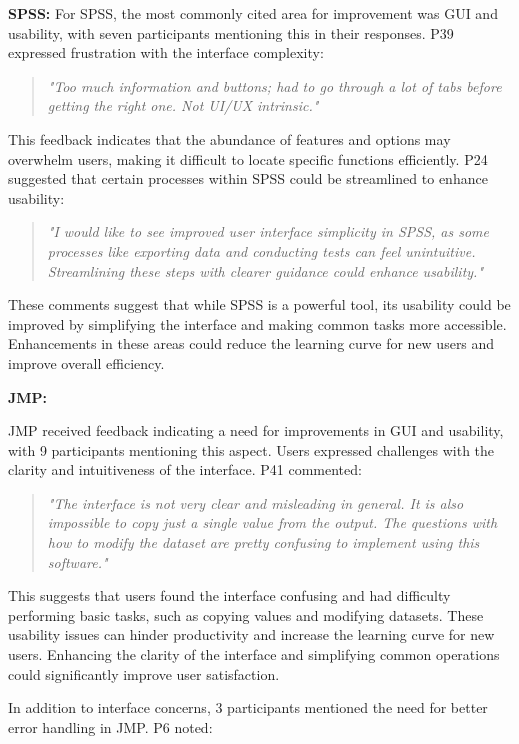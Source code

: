 \documentclass{article}
\begin{document}
\textbf{SPSS:}
For SPSS, the most commonly cited area for improvement was GUI and usability, with seven participants mentioning this in their responses. P39 expressed frustration with the interface complexity:

\begin{quote} \emph{"Too much information and buttons; had to go through a lot of tabs before getting the right one. Not UI/UX intrinsic." } \end{quote}

This feedback indicates that the abundance of features and options may overwhelm users, making it difficult to locate specific functions efficiently. P24 suggested that certain processes within SPSS could be streamlined to enhance usability:

\begin{quote} \emph{"I would like to see improved user interface simplicity in SPSS, as some processes like exporting data and conducting tests can feel unintuitive. Streamlining these steps with clearer guidance could enhance usability." } \end{quote}

These comments suggest that while SPSS is a powerful tool, its usability could be improved by simplifying the interface and making common tasks more accessible. Enhancements in these areas could reduce the learning curve for new users and improve overall efficiency.

\textbf{JMP:}

JMP received feedback indicating a need for improvements in GUI and usability, with 9 participants mentioning this aspect. Users expressed challenges with the clarity and intuitiveness of the interface. P41 commented:

\begin{quote} \emph{"The interface is not very clear and misleading in general. It is also impossible to copy just a single value from the output. The questions with how to modify the dataset are pretty confusing to implement using this software." } \end{quote}

This suggests that users found the interface confusing and had difficulty performing basic tasks, such as copying values and modifying datasets. These usability issues can hinder productivity and increase the learning curve for new users. Enhancing the clarity of the interface and simplifying common operations could significantly improve user satisfaction.

In addition to interface concerns, 3 participants mentioned the need for better error handling in JMP. P6 noted:
\end{document}
